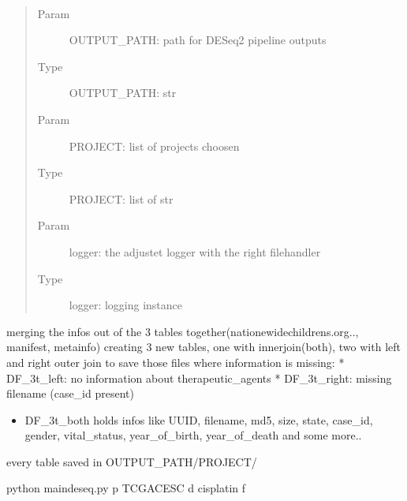 \documentclass[letterpaper,10pt,english]{sphinxmanual}
\begin{document}

\begin{fulllineitems}
\label{\detokenize{index:create_matrix_new.merging_meta_infos}}~\begin{quote}\begin{description}
\item[{Param}] \leavevmode
\sphinxAtStartPar
OUTPUT\_PATH: path for DESeq2 pipeline outputs

\item[{Type}] \leavevmode
\sphinxAtStartPar
OUTPUT\_PATH: str

\item[{Param}] \leavevmode
\sphinxAtStartPar
PROJECT: list of projects choosen

\item[{Type}] \leavevmode
\sphinxAtStartPar
PROJECT: list of str

\item[{Param}] \leavevmode
\sphinxAtStartPar
logger: the adjustet logger with the right filehandler

\item[{Type}] \leavevmode
\sphinxAtStartPar
logger: logging instance

\end{description}\end{quote}

\sphinxAtStartPar
merging the infos out of the 3 tables together(nationewidechildrens.org..,
manifest, metainfo)
creating 3 new tables, one with innerjoin(both), two with left and right
outer join to save those files where information is missing:
* DF\_3t\_left: no information about therapeutic\_agents
* DF\_3t\_right: missing filename (case\_id present)
\begin{itemize}
\item {} 
\sphinxAtStartPar
DF\_3t\_both holds infos like UUID, filename, md5, size, state, case\_id,        gender, vital\_status, year\_of\_birth, year\_of\_death and some more..

\end{itemize}

\sphinxAtStartPar
every table saved in OUTPUT\_PATH/PROJECT/

\begin{sphinxVerbatim}[commandchars=\\\{\}]
\PYGZdl{} python main\PYGZus{}deseq.py \PYGZhy{}p TCGA\PYGZhy{}CESC \PYGZhy{}d cisplatin \PYGZhy{}f 
\end{sphinxVerbatim}

\end{fulllineitems}
\end{document}
